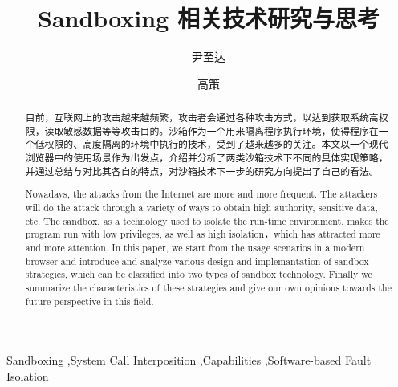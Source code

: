 \documentclass[final,5p,times]{elsarticle}
\begin{document}
\begin{frontmatter}



\title{Sandboxing 相关技术研究与思考}


\author{尹至达}
\author{高策}

\address{上海交通大学软件学院}

\begin{abstract}

目前，互联网上的攻击越来越频繁，攻击者会通过各种攻击方式，以达到获取系统高权限，读取敏感数据等等攻击目的。沙箱作为一个用来隔离程序执行环境，使得程序在一个低权限的、高度隔离的环境中执行的技术，受到了越来越多的关注。本文以一个现代浏览器中的使用场景作为出发点，介绍并分析了两类沙箱技术下不同的具体实现策略，并通过总结与对比其各自的特点，对沙箱技术下一步的研究方向提出了自己的看法。

Nowadays, the attacks from the Internet are more and more frequent. The attackers will do the attack through a variety of ways to obtain high authority, sensitive data, etc. The sandbox, as a technology used to isolate the run-time environment, makes the program run with low privileges, as well as high isolation，which has attracted more and more attention. In this paper, we start from the usage scenarios in a modern browser and introduce and analyze various design and implemantation of sandbox strategies, which can be classified into two types of sandbox technology. Finally we summarize the characteristics of these strategies and give our own opinions towards the future perspective in this field.

\end{abstract}

\begin{keyword}

Sandboxing \sep System Call Interposition \sep Capabilities \sep Software-based Fault Isolation

\end{keyword}

\end{frontmatter}
\end{document}
